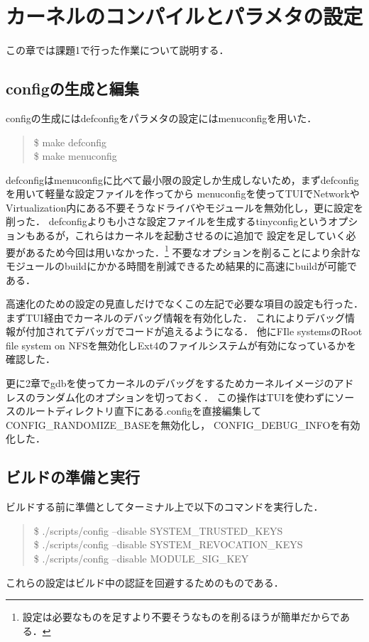 \chapter{カーネルのコンパイルとパラメタの設定}
この章では課題1で行った作業について説明する．

\section{configの生成と編集}
configの生成にはdefconfigをパラメタの設定にはmenuconfigを用いた．

\begin{quote}
\$ make defconfig\\
\$ make menuconfig
\end{quote}
defconfigはmenuconfigに比べて最小限の設定しか生成しないため，まずdefconfigを用いて軽量な設定ファイルを作ってから
menuconfigを使ってTUIでNetworkやVirtualization内にある不要そうなドライバやモジュールを無効化し，更に設定を削った．
defconfigよりも小さな設定ファイルを生成するtinyconfigというオプションもあるが，これらはカーネルを起動させるのに追加で
設定を足していく必要があるため今回は用いなかった．\footnote{設定は必要なものを足すより不要そうなものを削るほうが簡単だからである．}
不要なオプションを削ることにより余計なモジュールのbuildにかかる時間を削減できるため結果的に高速にbuildが可能である．

高速化のための設定の見直しだけでなくこの左記で必要な項目の設定も行った．
まずTUI経由でカーネルのデバッグ情報を有効化した．
これによりデバッグ情報が付加されてデバッガでコードが追えるようになる．
他にFIle systemsのRoot file system on NFSを無効化しExt4のファイルシステムが有効になっているかを確認した．

更に2章でgdbを使ってカーネルのデバッグをするためカーネルイメージのアドレスのランダム化のオプションを切っておく．
この操作はTUIを使わずにソースのルートディレクトリ直下にある.configを直接編集してCONFIG\_RANDOMIZE\_BASEを無効化し，
CONFIG\_DEBUG\_INFOを有効化した．


\section{ビルドの準備と実行}
ビルドする前に準備としてターミナル上で以下のコマンドを実行した．
\begin{quote}
\$ ./scripts/config --disable SYSTEM\_TRUSTED\_KEYS \\
\$ ./scripts/config --disable SYSTEM\_REVOCATION\_KEYS \\
\$ ./scripts/config --disable MODULE\_SIG\_KEY
\end{quote}
これらの設定はビルド中の認証を回避するためのものである．

